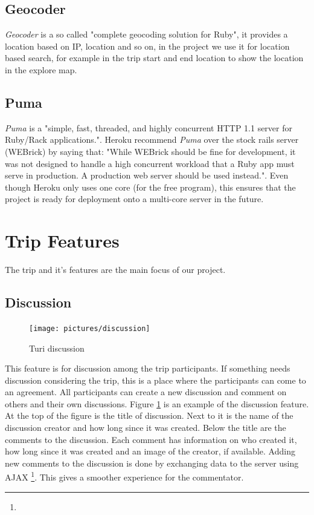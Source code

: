 \documentclass[a4paper]{article}
\begin{document}
\subsection{Geocoder}
\textit{Geocoder} is a so called "complete geocoding solution for Ruby"\cite{geocoder}, it provides a location based on IP, location and so on, in the project we use it for location based search, for example in the trip start and end location to show the location in the explore map. 

\subsection{Puma}
\textit{Puma} is a "simple, fast, threaded, and highly concurrent HTTP 1.1 server for Ruby/Rack applications."\cite{puma}. Heroku recommend \textit{Puma} over the stock rails server (WEBrick) by saying that: "While WEBrick should be fine for development, it was not designed to handle a high concurrent workload that a Ruby app must serve in production. A production web server should be used instead."\cite{heroku}. Even though Heroku only uses one core (for the free program), this ensures that the project is ready for deployment onto a multi-core server in the future.  


\section{Trip Features}
The trip and it's features are the main focus of our project. 
\subsection{Discussion}

\begin{figure}%
  \begin{center}
    \vspace{-0pt}
    \texttt{[image: pictures/discussion]}
  \end{center}
\caption{Turi discussion}
\label{fig:discussion}
\end{figure}

This feature is for discussion among the trip participants. If something needs discussion considering the trip, this is a place where the participants can come to an agreement. All participants can create a new discussion and comment on others and their own discussions. Figure \ref{fig:discussion} is an example of the discussion feature. At the top of the figure is the title of discussion. Next to it is the name of the discussion creator and how long since it was created. Below the title are the comments to the discussion. Each comment has information on who created it, how long since it was created and an image of the creator, if available. Adding new comments to the discussion is done by exchanging data to the server using AJAX \footnote{\AJAX}. This gives a smoother experience for the commentator. 
\end{document}
